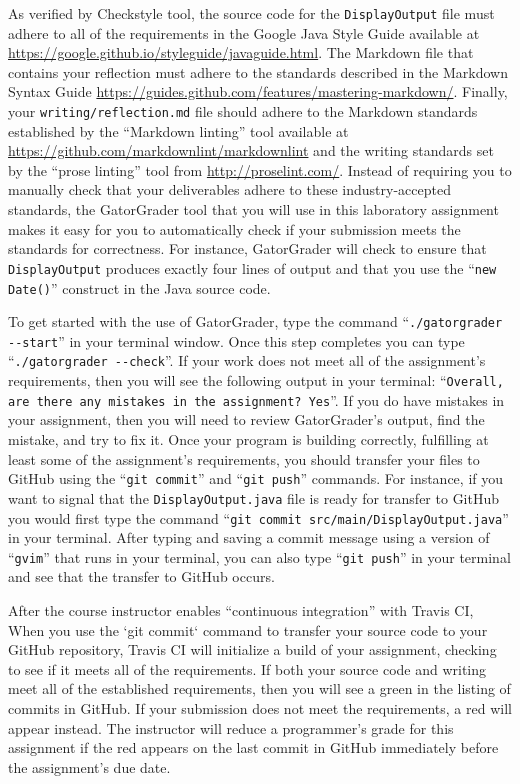 \documentclass[11pt]{article}
\newcommand{\mainprogram}{\lstinline{DisplayOutput}}
\newcommand{\mainprogramsource}{\lstinline{DisplayOutput.java}}
\newcommand{\reflection}{\lstinline{writing/reflection.md}}
\newcommand{\gatorgraderstart}{\command{./gatorgrader --start}}
\newcommand{\gatorgradercheck}{\command{./gatorgrader --check}}
\newcommand{\gitcommitfile}[1]{``\lstinline{git commit #1}''}
\newcommand{\gitcommit}{\command{git commit}}
\newcommand{\gitpush}{\command{git push}}
\newcommand{\command}[1]{``\lstinline{#1}''}
\newcommand{\step}[1]{``{#1}''}
\newcommand{\checkmark}{\ding{51}}
\newcommand{\naughtmark}{\ding{55}}
\begin{document}
As verified by Checkstyle tool, the source code for the \mainprogram{} file must adhere to all of the requirements in
the Google Java Style Guide available at \url{https://google.github.io/styleguide/javaguide.html}. The Markdown file
that contains your reflection must adhere to the standards described in the Markdown Syntax Guide
\url{https://guides.github.com/features/mastering-markdown/}. Finally, your \reflection{} file should adhere to the
Markdown standards established by the \step{Markdown linting} tool available at
\url{https://github.com/markdownlint/markdownlint} and the writing standards set by the \step{prose linting} tool from
\url{http://proselint.com/}. Instead of requiring you to manually check that your deliverables adhere to these
industry-accepted standards, the GatorGrader tool that you will use in this laboratory assignment makes it easy for you
to automatically check if your submission meets the standards for correctness. For instance, GatorGrader will check to
ensure that \mainprogram{} produces exactly four lines of output and that you use the \command{new Date()} construct in
the Java source code.

To get started with the use of GatorGrader, type the command \gatorgraderstart{} in your terminal window. Once this step
completes you can type \gatorgradercheck{}. If your work does not meet all of the assignment's requirements, then you
will see the following output in your terminal: \command{Overall, are there any mistakes in the assignment? Yes}. If you
do have mistakes in your assignment, then you will need to review GatorGrader's output, find the mistake, and try to fix
it. Once your program is building correctly, fulfilling at least some of the assignment's requirements, you should
transfer your files to GitHub using the \gitcommit{} and \gitpush{} commands. For instance, if you want to signal that
the \mainprogramsource{} file is ready for transfer to GitHub you would first type the command
\gitcommitfile{src/main/DisplayOutput.java} in your terminal. After typing and saving a commit message using a version
of \command{gvim} that runs in your terminal, you can also type \gitpush{} in your terminal and see that the transfer to
GitHub occurs.


After the course instructor enables \step{continuous integration} with Travis CI, When you use the `git commit` command
to transfer your source code to your GitHub repository, Travis CI will initialize a build of your assignment, checking
to see if it meets all of the requirements. If both your source code and writing meet all of the established
requirements, then you will see a green \checkmark{} in the listing of commits in GitHub. If your submission does not
meet the requirements, a red \naughtmark{} will appear instead. The instructor will reduce a programmer's grade for this
assignment if the red \naughtmark{} appears on the last commit in GitHub immediately before the assignment's due date.
\end{document}
